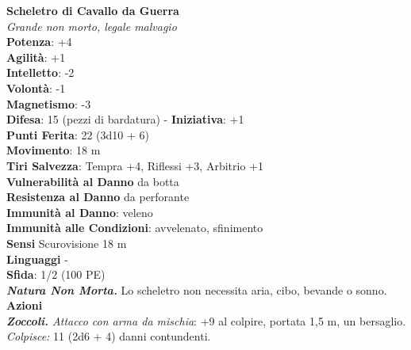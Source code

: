 \begin{multicols}{2}
\medskip\textbf{Scheletro di Cavallo da Guerra}\\
\emph{Grande non morto, legale malvagio}\\
\textbf{Potenza}: +4\\
\textbf{Agilità}: +1\\
\textbf{Intelletto}: -2\\
\textbf{Volontà}: -1\\
\textbf{Magnetismo}: -3\\
\textbf{Difesa}: 15 (pezzi di bardatura) - \textbf{Iniziativa}: +1\\
\textbf{Punti Ferita}: 22 (3d10 + 6)\\
\textbf{Movimento}: 18 m\\
\textbf{Tiri Salvezza}: Tempra +4, Riflessi +3, Arbitrio +1\\
\textbf{Vulnerabilità al Danno} da botta\\
\textbf{Resistenza al Danno} da perforante\\
\textbf{Immunità al Danno}: veleno\\
\textbf{Immunità alle Condizioni}: avvelenato, sfinimento\\
\textbf{Sensi} Scurovisione 18 m\\
\textbf{Linguaggi} -\\
\textbf{Sfida}: 1/2 (100 PE)\smallskip\\
\emph{\textbf{Natura Non Morta.}} Lo scheletro non necessita aria, cibo, bevande o sonno.\\
\smallskip\textbf{Azioni}\\
\emph{\textbf{Zoccoli.} Attacco con arma da mischia}: +9 al colpire, portata 1,5 m, un bersaglio.\\
\emph{Colpisce:} 11 (2d6 + 4) danni contundenti.\\


\end{multicols}
